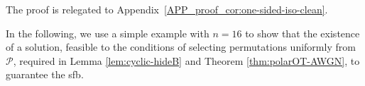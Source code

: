\documentclass[onecolumn]{IEEEtran} %
\newcounter{boxcounterR} %
\newcommand{\myboxr}[2]{
    \refstepcounter{boxcounterR} %
    \begin{tcolorbox}[colback=red!5!white, colframe=red!75!black, fonttitle=\bfseries, title=TBD \arabic{boxcounterR}.\quad #1]
        #2
    \end{tcolorbox}
}
\newcommand{\1}{\mathbbm{1}}
\DeclareMathOperator{\Aut}{Aut}
\theoremstyle{boldremark}
\newtheorem{corollary}{Corollary}
\begin{document}

The proof is relegated to Appendix~\ref{APP_proof_cor:one-sided-iso-clean}.










In the following, we use a simple example with $n=16$ to show that the existence of a solution, feasible to the conditions of selecting permutations uniformly from $\mathcal{P}$, required in Lemma \ref{lem:cyclic-hideB} and Theorem \ref{thm:polarOT-AWGN}, to guarantee the \gls{sfb}.
\end{document}
